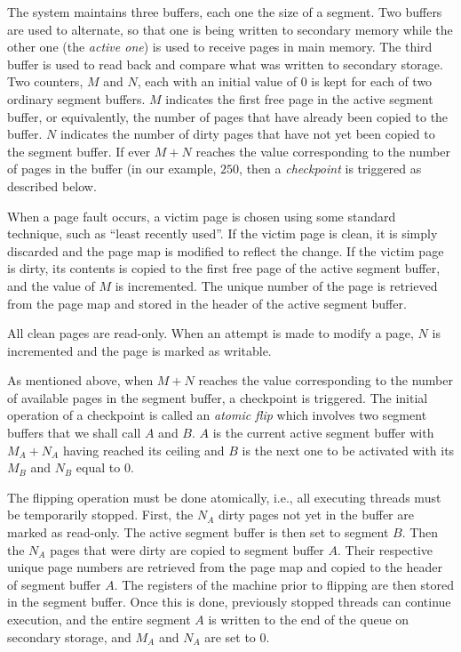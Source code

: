 The system maintains three buffers, each one the size of a segment.
Two buffers are used to alternate, so that one is being written to
secondary memory while the other one (the \emph{active one}) is used
to receive pages in main memory.  The third buffer is used to read
back and compare what was written to secondary storage.  Two counters,
$M$ and $N$, each with an initial value of $0$ is kept for each of two
ordinary segment buffers.  $M$ indicates the first free page in the
active segment buffer, or equivalently, the number of pages that have
already been copied to the buffer.  $N$ indicates the number of dirty
pages that have not yet been copied to the segment buffer.  If ever
$M+N$ reaches the value corresponding to the number of pages in the
buffer (in our example, $250$, then a \emph{checkpoint} is triggered
as described below.

When a page fault occurs, a victim page is chosen using some standard
technique, such as ``least recently used''.  If the victim page is
clean, it is simply discarded and the page map is modified to
reflect the change.  If the victim page is dirty, its contents is
copied to the first free page of the active segment buffer, and the
value of $M$ is incremented.  The unique number of the page is
retrieved from the page map and stored in the header of the active
segment buffer.

All clean pages are read-only.  When an attempt is made to modify a
page, $N$ is incremented and the page is marked as writable.

As mentioned above, when $M+N$ reaches the value corresponding to the
number of available pages in the segment buffer, a checkpoint is
triggered.  The initial operation of a checkpoint is called an
\emph{atomic flip} which involves two segment buffers that we shall
call $A$ and $B$.  $A$ is the current active segment buffer with $M_A+N_A$
having reached its ceiling and $B$ is the next one to be activated
with its $M_B$ and $N_B$ equal to $0$.

The flipping operation must be done atomically, i.e., all executing
threads must be temporarily stopped.  First, the $N_A$ dirty pages not
yet in the buffer are marked as read-only. The active segment
buffer is then set to segment $B$.  Then the $N_A$ pages that
were dirty are copied to segment buffer $A$.  Their respective unique page
numbers are retrieved from the page map and copied to the header of
segment buffer $A$.  The registers of the machine prior to flipping
are then stored in the segment buffer.  Once this is done, previously
stopped threads can continue execution, and the entire segment $A$ is
written to the end of the queue on secondary storage, and $M_A$ and
$N_A$ are set to $0$.


